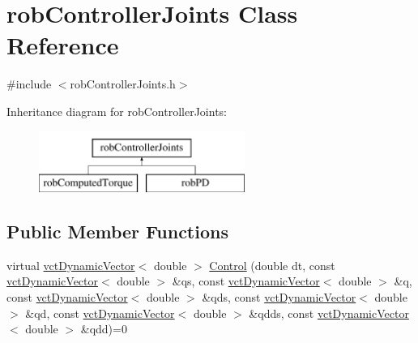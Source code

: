 \hypertarget{classrob_controller_joints}{\section{rob\-Controller\-Joints Class Reference}
\label{classrob_controller_joints}
}


{\ttfamily \#include $<$rob\-Controller\-Joints.\-h$>$}

Inheritance diagram for rob\-Controller\-Joints\-:\begin{figure}[H]
\begin{center}
\leavevmode
\includegraphics[height=2.000000cm]{d6/df7/classrob_controller_joints}
\end{center}
\end{figure}
\subsection*{Public Member Functions}
\begin{DoxyCompactItemize}
\item 
virtual \hyperlink{classvct_dynamic_vector}{vct\-Dynamic\-Vector}$<$ double $>$ \hyperlink{classrob_controller_joints_a768d384eb9f3bdd173abe41708a97aff}{Control} (double dt, const \hyperlink{classvct_dynamic_vector}{vct\-Dynamic\-Vector}$<$ double $>$ \&qs, const \hyperlink{classvct_dynamic_vector}{vct\-Dynamic\-Vector}$<$ double $>$ \&q, const \hyperlink{classvct_dynamic_vector}{vct\-Dynamic\-Vector}$<$ double $>$ \&qds, const \hyperlink{classvct_dynamic_vector}{vct\-Dynamic\-Vector}$<$ double $>$ \&qd, const \hyperlink{classvct_dynamic_vector}{vct\-Dynamic\-Vector}$<$ double $>$ \&qdds, const \hyperlink{classvct_dynamic_vector}{vct\-Dynamic\-Vector}$<$ double $>$ \&qdd)=0
\end{DoxyCompactItemize}


